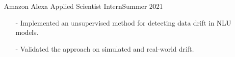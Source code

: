   {Amazon Alexa Applied Scientist Intern}{Summer 2021}{
  \begin{itemize}
      \item[-] Implemented an unsupervised method for detecting data drift in NLU models.
      \item[-] Validated the approach on simulated and real-world drift.
  \end{itemize}
   }{}
\vspace{1mm}